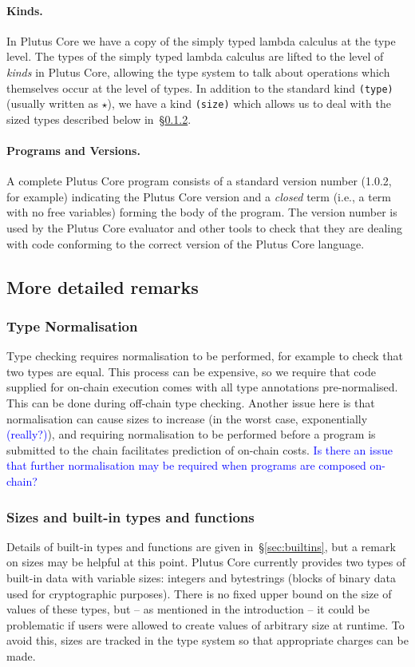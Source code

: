 \documentclass[a4paper]{article}
\newcommand{\blue}[1]{\textcolor{blue}{#1}}
\begin{document}
\paragraph{Kinds.} In Plutus Core we have a copy of the 
simply typed lambda calculus at the type level. The types of the
simply typed lambda calculus are lifted to the level of
\textit{kinds} in Plutus Core, allowing the type system to talk about
operations which themselves occur at the level of types. In addition
to the standard kind \texttt{(type)} (usually written as $\star$), we
have a kind \texttt{(size)} which allows us to deal with the sized
types described below in~\S\ref{sec:size-note}.


\paragraph{Programs and Versions.} A complete Plutus Core program 
consists of a standard version number (1.0.2, for example) indicating
the Plutus Core version and a \textit{closed} term (i.e., a term with no
free variables) forming the body of the program.  The version number
is used by the Plutus Core evaluator and other tools to check that
they are dealing with code conforming to the correct version of the
Plutus Core language.

\subsection{More detailed remarks}
\subsubsection{Type Normalisation}
 Type checking requires normalisation to be performed, for example to
 check that two types are equal.  This process can be expensive, so we
 require that code supplied for on-chain execution comes with all type
 annotations pre-normalised.  This can be done during off-chain type
 checking.  Another issue here is that normalisation can cause sizes
 to increase (in the worst case, exponentially \blue{(really?)}), and
 requiring normalisation to be performed before a program is submitted
 to the chain facilitates prediction of on-chain costs.  \blue{Is
   there an issue that further normalisation may be required when
   programs are composed on-chain?}

\subsubsection{Sizes and built-in types and functions}
\label{sec:size-note}
Details of built-in types and functions are given
in~\S\ref{sec:builtins}, but a remark on sizes may be helpful at this
point.  Plutus Core currently provides two types of built-in data with
variable sizes: integers and bytestrings (blocks of binary data used
for cryptographic purposes).  There is no fixed upper bound on the
size of values of these types, but -- as mentioned in the introduction -- it
could be problematic if users were allowed to create values of arbitrary size 
at runtime. To avoid this, sizes are tracked in the type system so that 
appropriate charges can be made. 
\end{document}

